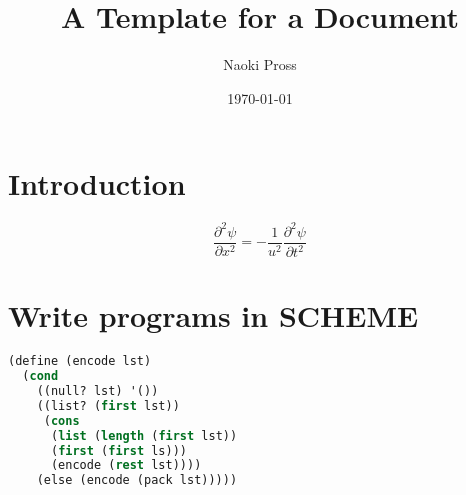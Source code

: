 \documentclass[a4paper, twocolumn]{article}
\title{A Template for a Document}
\author{
  Naoki Pross%
}
\date{\today}
\begin{document}
\maketitle


\tableofcontents

\section{Introduction}
\blindtext
\[
  \frac{\partial^2\psi}{\partial x^2} =
  - \frac{1}{u^2}\frac{\partial^2\psi}{\partial t^2}
\]

\section{Write programs in SCHEME}
\blindtext
\begin{lstlisting}[language=lisp]
(define (encode lst)
  (cond
    ((null? lst) '())
    ((list? (first lst))
     (cons
      (list (length (first lst))
      (first (first ls)))
      (encode (rest lst))))
    (else (encode (pack lst)))))
\end{lstlisting}
\blindtext[3]
\end{document}
